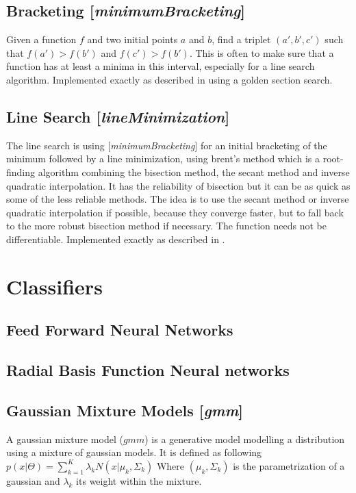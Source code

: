 \documentclass[11pt]{article}
\newcommand{\nllref}[1]{[\small{\textit{#1}}]}
\begin{document}
\subsection{Bracketing \nllref{minimumBracketing}}
Given a function $f$ and two initial points $a$ and $b$, find a triplet $(a', b', c')$ such that $f(a')>f(b')$ and  $f(c')>f(b')$. This is often to make sure that a function has at least a minima in this interval, especially for a line search algorithm. Implemented exactly as described in \cite{NumericalRecipes} using a golden section search.

\subsection{Line Search \nllref{lineMinimization}}
The line search is using \nllref{minimumBracketing} for an initial bracketing of the minimum followed by a line minimization, using brent's method which is a root-finding algorithm combining the bisection method, the secant method and inverse quadratic interpolation. It has the reliability of bisection but it can be as quick as some of the less reliable methods. The idea is to use the secant method or inverse quadratic interpolation if possible, because they converge faster, but to fall back to the more robust bisection method if necessary. The function needs not be differentiable. Implemented exactly as described in \cite{NumericalRecipes}.

\section{Classifiers}
\subsection{Feed Forward Neural Networks}
\subsection{Radial Basis Function Neural networks}
\subsection{Gaussian Mixture Models \nllref{gmm}}
A gaussian mixture model ($gmm$) is a generative model modelling a distribution using a mixture of gaussian models. It is defined as following $p(x|\Theta)= \sum_{k=1}^K \lambda _k N(x|\mu _k, \Sigma _k)$ Where $(\mu _k, \Sigma _k)$ is the parametrization of a gaussian and $\lambda _k$ its weight within the mixture.
\end{document}

